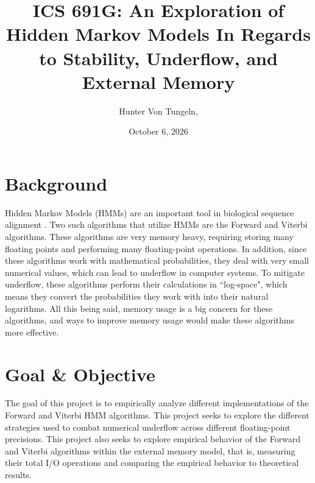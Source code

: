 \documentclass{article}
\title{ICS 691G: An Exploration of Hidden Markov Models In Regards to Stability, Underflow, and External Memory}
\author{Hunter Von Tungeln,}
\date{October 6, 2026}
\begin{document}
\maketitle
\section{Background}
Hidden Markov Models (HMMs) are an important tool in biological sequence alignment \cite{rabiner1989tutorial}. Two such algorithms that utilize HMMs are the Forward and Viterbi algorithms.  These algorithms are very memory heavy, requiring storing many floating points and performing many floating-point operations. In addition, since these algorithms work with mathematical probabilities, they deal with very small numerical values, which can lead to underflow in computer systems. To mitigate underflow, these algorithms perform their calculations in ``log-space", which means they convert the probabilities they work with into their natural logarithms. All this being said, memory usage is a big concern for these algorithms, and ways to improve memory usage would make these algorithms more effective. 
\section{Goal \& Objective}
The goal of this project is to empirically analyze different implementations of the Forward and Viterbi HMM algorithms.  This project seeks to explore the different strategies used to combat numerical underflow across different floating-point precisions. This project also seeks to explore empirical behavior of the Forward and Viterbi algorithms within the external memory model, that is, measuring their total I/O operations and comparing the empirical behavior to theoretical results. 
\end{document}
